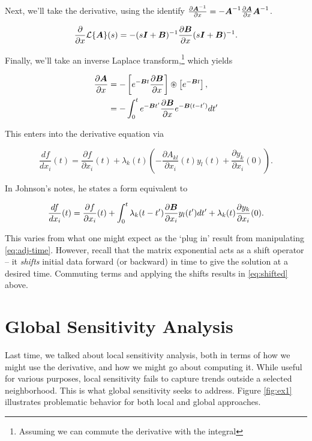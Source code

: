 \documentclass[../primer.tex]{subfiles}
\begin{document}
\noindent Next, we'll take the derivative, using the identify
\(\frac{\partial\boldsymbol{A}^{-1}}{\partial
x}=\nobreak-\boldsymbol{A}^{-1}\frac{\partial\boldsymbol{A}}{\partial x}\boldsymbol{A}^{-1}\).

\begin{equation}
  \frac{\partial}{\partial x}\cL\{\mA\}(s) = %
    -(s\mI+\mB)^{-1}\frac{\partial\mB}{\partial x}(s\mI+\mB)^{-1}.
\end{equation}

\noindent Finally, we'll take an inverse Laplace transform,\footnote{Assuming we can
commute the derivative with the integral} which yields

\begin{equation}\begin{aligned}
  \frac{\partial\mA}{\partial x} &= -\left[e^{-\mB t}\frac{\partial\mB}{\partial x}\right] %
    \circledast \left[e^{-\mB t}\right], \\
    &= -\int_0^t e^{-\mB t'}\frac{\partial\mB}{\partial x}e^{-\mB(t-t')}dt'
\end{aligned}\end{equation}

This enters into the derivative equation via

\begin{equation}\label{eq:adj-time}
  \frac{df}{dx_i}(t) = \frac{\partial f}{\partial x_i}(t) + \lambda_k(t)%
    \left(-\frac{\partial A_{kl}}{\partial x_i}(t) y_l(t) + \frac{\partial y_k}{\partial x_i}(0)\right).
\end{equation}

In Johnson's notes, he states a form equivalent to

\begin{equation}\label{eq:shifted}
  \frac{df}{dx_i}(t) = \frac{\partial f}{\partial x_i}(t) + %
    \int_0^t\lambda_k(t-t')\frac{\partial\mB}{\partial x_i}y_l(t')dt' + %
    \lambda_k(t)\frac{\partial y_k}{\partial x_i}(0).
\end{equation}

This varies from what one might expect as the `plug in' result from manipulating
\eqref{eq:adj-time}. However, recall that the matrix exponential acts as a shift
operator -- it \emph{shifts} initial data forward (or backward) in time to give the
solution at a desired time. Commuting terms and applying the shifts results in
\eqref{eq:shifted} above.

\section{Global Sensitivity Analysis}
\label{sec:org81b0ac8}
Last time, we talked about local sensitivity analysis, both in terms of how we
might use the derivative, and how we might go about computing it. While useful
for various purposes, local sensitivity fails to capture trends outside a
selected neighborhood. This is what global sensitivity seeks to address. Figure
\ref{fig:ex1} illustrates problematic behavior for both local and global
approaches.
\end{document}
